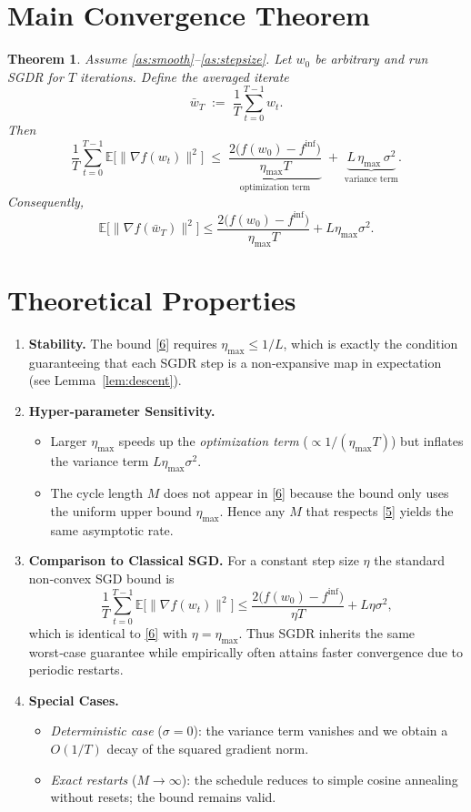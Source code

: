 \documentclass{article}
\newtheorem{theorem}{Theorem}
\newcommand{\EE}{\mathbb{E}}
\begin{document}
\section*{Main Convergence Theorem}
\begin{theorem}\label{thm:main}
Assume \ref{as:smooth}–\ref{as:stepsize}. Let $w_{0}$ be arbitrary and run SGDR for $T$ iterations. Define the averaged iterate
\[
\bar w_{T}\;:=\;\frac{1}{T}\sum_{t=0}^{T-1}w_{t}.
\]
Then
\[
\frac{1}{T}\sum_{t=0}^{T-1}\EE\!\bigl[\|\nabla f(w_{t})\|^{2}\bigr]
\;\le\;
\underbrace{\frac{2\bigl(f(w_{0})-f^{\inf}\bigr)}{\eta_{\max}T}}_{\text{optimization term}}
\;+\;
\underbrace{L\,\eta_{\max}\,\sigma^{2}}_{\text{variance term}}.
\tag{6}
\]
Consequently,
\[
\EE\!\bigl[\|\nabla f(\bar w_{T})\|^{2}\bigr]\le
\frac{2\bigl(f(w_{0})-f^{\inf}\bigr)}{\eta_{\max}T}+L\eta_{\max}\sigma^{2}.
\]
\end{theorem}

\section*{Theoretical Properties}
\begin{enumerate}[label=\arabic*.]
\item \textbf{Stability.} The bound \eqref{6} requires $\eta_{\max}\le 1/L$, which is exactly the condition guaranteeing that each SGDR step is a non‑expansive map in expectation (see Lemma~\ref{lem:descent}).

\item \textbf{Hyper‑parameter Sensitivity.}
   \begin{itemize}
   \item Larger $\eta_{\max}$ speeds up the \emph{optimization term} ($\propto 1/(\eta_{\max}T)$) but inflates the variance term $L\eta_{\max}\sigma^{2}$.
   \item The cycle length $M$ does not appear in \eqref{6} because the bound only uses the uniform upper bound $\eta_{\max}$. Hence any $M$ that respects \eqref{5} yields the same asymptotic rate.
   \end{itemize}
\item \textbf{Comparison to Classical SGD.} For a constant step size $\eta$ the standard non‑convex SGD bound is
\[
\frac{1}{T}\sum_{t=0}^{T-1}\EE\!\bigl[\|\nabla f(w_{t})\|^{2}\bigr]
\le\frac{2\bigl(f(w_{0})-f^{\inf}\bigr)}{\eta T}+L\eta\sigma^{2},
\]
which is identical to \eqref{6} with $\eta=\eta_{\max}$. Thus SGDR inherits the same worst‑case guarantee while empirically often attains faster convergence due to periodic restarts.

\item \textbf{Special Cases.}
   \begin{itemize}
   \item \emph{Deterministic case} ($\sigma=0$): the variance term vanishes and we obtain a $O(1/T)$ decay of the squared gradient norm.
   \item \emph{Exact restarts} ($M\to\infty$): the schedule reduces to simple cosine annealing without resets; the bound remains valid.
   \end{itemize}
\end{enumerate}
\end{document}
